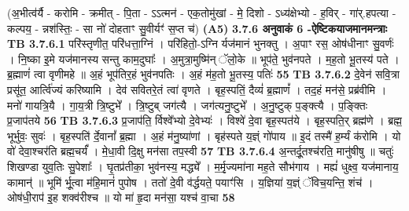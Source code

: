 \documentclass[17pt]{extarticle}
\begin{document}
{{{{{{{{{{{{{{{{{{{                  \newline
                                    (अ॒भीत्व॑र्यै - करोमि - क्रमीत् - पि॒ता - ऽऽत्मन॑ - एक॒तोमु॑खां - मे॒ दिशो - ऽध्य॑क्षेभ्यो - ह॒विर् - गा॑र्.हपत्या - कल्पय॒ - न्नश॑स्तिः॒ - सा नो॑ दोहताꣳ सु॒वीर्यꣳ॑ स॒प्त च॑) \textbf{(A5)} \newline \newline
                \textbf{ 3.7.6     अनुवाकं   6 -ऐष्टिकयाजमानमन्त्राः} \newline
                                \textbf{ TB 3.7.6.1} \newline
                  परि॑स्तृणीत॒ परि॑धत्ता॒ग्निं । परि॑हितो॒-ऽग्नि र्यज॑मानं भुनक्तु । अ॒पाꣳ रस॒ ओष॑धीनाꣳ सु॒वर्णः॑ । नि॒ष्का इ॒मे यज॑मानस्य सन्तु काम॒दुघाः᳚ । अ॒मुत्रा॒मुष्मि॑न् ॅलो॒के ॥ भूप॑ते॒ भुव॑नपते । म॒ह॒तो भू॒तस्य॑ पते । ब्र॒ह्माणं॑ त्वा वृणीमहे ॥ अ॒हं भूप॑तिर॒हं भुव॑नपतिः । अ॒हं म॑ह॒तो भू॒तस्य॒ पतिः॑ \textbf{ 55} \newline
                  \newline
                                \textbf{ TB 3.7.6.2} \newline
                  दे॒वेन॑ सवि॒त्रा प्रसू॑त॒ आर्त्वि॑ज्यं करिष्यामि । देव॑ सवितरे॒तं त्वा॑ वृणते । बृह॒स्पतिं॒ दैव्यं॑ ब्र॒ह्माणं᳚ । तद॒हं मन॑से॒ प्रब्र॑वीमि । मनो॑ गायत्रि॒यै । गा॒य॒त्री त्रि॒ष्टुभे᳚ । त्रि॒ष्टुब् जग॑त्यै । जग॑त्यनु॒ष्टुभे᳚ । अ॒नु॒ष्टुक् प॒ङ्क्त्यै । प॒ङ्क्तिः प्र॒जाप॑तये \textbf{ 56} \newline
                  \newline
                                \textbf{ TB 3.7.6.3} \newline
                  प्र॒जाप॑ति॒ र्विश्वे᳚भ्यो दे॒वेभ्यः॑ । विश्वे॑ दे॒वा बृह॒स्पत॑ये । बृह॒स्पति॒र् ब्रह्म॑णे । ब्रह्म॒ भूर्भुवः॒ सुवः॑ । बृह॒स्पति॑ र्दे॒वानां᳚ ब्र॒ह्मा । अ॒हं म॑नु॒ष्या॑णां । बृह॑स्पते य॒ज्ञ्ं गो॑पाय ॥ इ॒दं तस्मै॑ ह॒र्म्यं क॑रोमि । यो वो॑ देवा॒श्चर॑ति ब्रह्म॒चर्यं᳚ । मे॒धा॒वी दि॒क्षु मन॑सा तप॒स्वी \textbf{ 57} \newline
                  \newline
                                \textbf{ TB 3.7.6.4} \newline
                  अ॒न्तर्दू॒तश्च॑रति॒ मानु॑षीषु ॥ चतुः॑ शिखण्डा युव॒तिः सु॒पेशाः᳚ । घृ॒तप्र॑तीका॒ भुव॑नस्य॒ मद्ध्ये᳚ । म॒र्मृ॒ज्यमा॑ना मह॒ते सौभ॑गाय । मह्यं॑ धुक्ष्व॒ यज॑मानाय॒ कामान्॑ ॥ भूमि॑ र्भू॒त्वा म॑हि॒मानं॑ पुपोष । ततो॑ दे॒वी व॑र्द्धयते॒ पयाꣳ॑सि । य॒ज्ञिया॑ य॒ज्ञ्ं ॅविच॒यन्ति॒ शंच॑ । ओष॑धी॒राप॑ इ॒ह शक्व॑रीश्च ॥ यो मा॑ हृ॒दा मन॑सा॒ यश्च॑ वा॒चा \textbf{ 58} \newline
}}}}}}}}}}}}}}}}}}}
\end{document}

